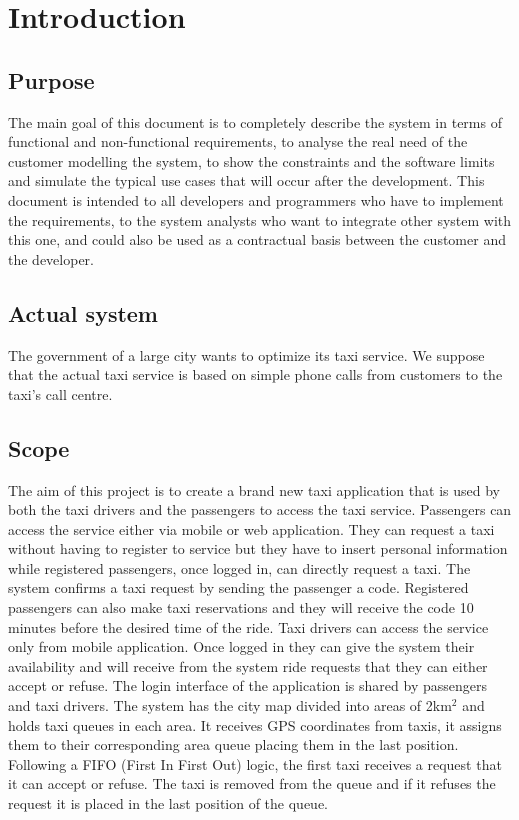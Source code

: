 \section{Introduction}
\subsection{Purpose}
The main goal of this document is to completely describe the system in terms of functional and non-functional requirements, to analyse the real need of the customer modelling the system, to show the constraints and the software limits and simulate the typical use cases that will occur after the development. This document is intended to all developers and programmers who have to implement the requirements, to the system analysts who want to integrate other system with this one, and could also be used as a contractual basis between the customer and the developer.
\subsection{Actual system}
The government of a large city wants to optimize its taxi service. We suppose that the actual taxi service is based on simple phone calls from customers to the taxi's call centre.
\subsection{Scope}
The aim of this project is to create a brand new taxi application that is used by both the taxi drivers and the passengers to access the taxi service. Passengers can access the service either via mobile or web application. They can request a taxi without having to register to service but they have to insert personal information while registered passengers, once logged in, can directly request a taxi. The system confirms a taxi request by sending the passenger a code. Registered passengers can also make taxi reservations and they will receive the code 10 minutes before the desired time of the ride. Taxi drivers can access the service only from mobile application. Once logged in they can give the system their availability and will receive from the system ride requests that they can either accept or refuse. The login interface of the application is shared by passengers and taxi drivers.
The system has the city map divided into areas of 2km$^{2}$ and holds taxi queues in each area. It receives GPS coordinates from taxis, it assigns them to their corresponding area queue placing them in the last position. Following a FIFO (First In First Out) logic, the first taxi receives a request that it can accept or refuse. The taxi is removed from the queue and if it refuses the request it is placed in the last position of the queue.
